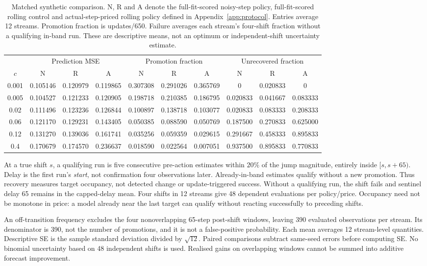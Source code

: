 \begin{table}[t]
\centering
\caption{Matched synthetic comparison. N, R and A denote the full-fit-scored noisy-step policy, full-fit-scored rolling control and actual-step-priced rolling policy defined in Appendix~\ref{app:protocol}. Entries average 12 streams. Promotion fraction is updates/650. Failure averages each stream's four-shift fraction without a qualifying in-band run. These are descriptive means, not an optimum or independent-shift uncertainty estimate.}
\label{tab:policies}
\begin{tabular}{c|ccc|ccc|ccc}
\hline
&\multicolumn{3}{c|}{Prediction MSE}&\multicolumn{3}{c|}{Promotion fraction}&\multicolumn{3}{c}{Unrecovered fraction}\\
\(c\)&N&R&A&N&R&A&N&R&A\\ \hline
0.001&0.105146&0.120979&0.119865&0.307308&0.291026&0.365769&0&0.020833&0\\
0.005&0.104527&0.121233&0.120905&0.198718&0.210385&0.186795&0.020833&0.041667&0.083333\\
0.02&0.111496&0.123236&0.126844&0.100897&0.138718&0.103077&0.020833&0.083333&0.208333\\
0.06&0.121170&0.129231&0.143405&0.050385&0.088590&0.050769&0.187500&0.270833&0.625000\\
0.12&0.131270&0.139036&0.161741&0.035256&0.059359&0.029615&0.291667&0.458333&0.895833\\
0.4&0.170679&0.174570&0.236637&0.018590&0.022564&0.007051&0.937500&0.895833&0.770833\\ \hline
\end{tabular}
\end{table}

At a true shift \(s\), a qualifying run is five consecutive pre-action estimates within \(20\%\) of the jump magnitude, entirely inside \([s,s+65)\). Delay is the first run's \emph{start}, not confirmation four observations later. Already-in-band estimates qualify without a new promotion. Thus recovery measures target occupancy, not detected change or update-triggered success. Without a qualifying run, the shift fails and sentinel delay 65 remains in the capped-delay mean. Four shifts in 12 streams give 48 dependent evaluations per policy/price. Occupancy need not be monotone in price: a model already near the last target can qualify without reacting successfully to preceding shifts.

An off-transition frequency excludes the four nonoverlapping 65-step post-shift windows, leaving 390 evaluated observations per stream. Its denominator is 390, not the number of promotions, and it is not a false-positive probability. Each mean averages 12 stream-level quantities. Descriptive SE is the sample standard deviation divided by \(\sqrt{12}\). Paired comparisons subtract same-seed errors before computing SE. No binomial uncertainty based on 48 independent shifts is used. Realised gains on overlapping windows cannot be summed into additive forecast improvement.

